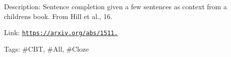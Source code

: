 Description\+: Sentence completion given a few sentences as context from a children\textquotesingle{}s book. From Hill et al., \textquotesingle{}16.

Link\+: \href{https://arxiv.org/abs/1511.02301}{\tt https\+://arxiv.\+org/abs/1511.}

Tags\+: \#\+C\+BT, \#\+All, \#\+Cloze 